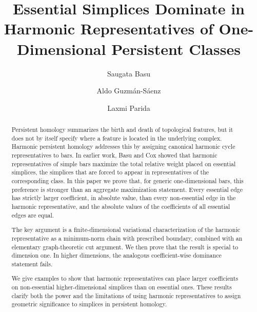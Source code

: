 \documentclass[11pt]{amsart}
\theoremstyle{theorem}
\theoremstyle{remark}
\theoremstyle{definition}
\begin{document}
\title[Essential Simplices Dominate in Harmonic Representatives]{Essential Simplices Dominate in Harmonic Representatives of One-Dimensional Persistent Classes}

\author{Saugata Basu}
\address{Department of Mathematics,
Purdue University, West Lafayette, IN 47906, U.S.A.}

\author{Aldo Guzmán-Sáenz}
\address{Independent Researcher}


\author{Laxmi Parida}
\address{IBM Research, Yorktown Heights}


\date{}
\begin{abstract}
 Persistent homology summarizes 
   the birth and death of topological features, but it does not by itself specify where a feature is located in the underlying complex. Harmonic persistent homology addresses this by assigning canonical harmonic cycle representatives to bars. In earlier work, Basu and Cox \cite{Basu-Cox} showed that harmonic representatives of simple bars maximize the total relative weight placed on essential simplices, the simplices that are forced to appear in representatives of the corresponding class.
In this paper we prove that, for generic one-dimensional bars, this preference is stronger than an aggregate maximization statement. Every essential edge has strictly larger coefficient, in absolute value, than every non-essential edge in the harmonic representative, and the absolute values of the coefficients of all essential edges are equal.

The key argument is a finite-dimensional variational characterization of the harmonic representative as a minimum-norm chain with prescribed boundary, combined with an elementary graph-theoretic cut argument.
We then prove that the result is special to dimension one. In higher dimensions, the analogous coefficient-wise dominance statement fails.

We give examples to show that harmonic representatives can place larger coefficients on non-essential higher-dimensional simplices than on essential ones. These results clarify both the power and the limitations of using harmonic representatives to assign geometric significance to simplices in persistent homology. 
\end{abstract}
\end{document}
